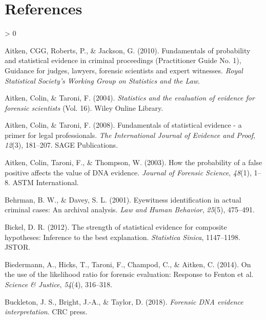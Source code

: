 \documentclass[
  10pt,
  dvipsnames,enabledeprecatedfontcommands]{scrartcl}
\newlength{\cslhangindent}
\newenvironment{CSLReferences}[2] %
 {%
  \setlength{\parindent}{0pt}
  \ifodd #1 \everypar{\setlength{\hangindent}{\cslhangindent}}\ignorespaces\fi
  \ifnum #2 > 0
  \setlength{\parskip}{#2\baselineskip}
  \fi
 }%
 {}
\begin{document}
\hypertarget{references}{%
\section*{References}\label{references}}

\hypertarget{refs}{}
\begin{CSLReferences}{1}{0}
\leavevmode\hypertarget{ref-aitken2010fundamentals}{}%
Aitken, CGG, Roberts, P., \& Jackson, G. (2010). Fundamentals of
probability and statistical evidence in criminal proceedings
({P}ractitioner {G}uide {N}o. 1), {G}uidance for judges, lawyers,
forensic scientists and expert witnesses. \emph{Royal Statistical
Society's Working Group on Statistics and the Law}.

\leavevmode\hypertarget{ref-aitken2004statistics}{}%
Aitken, Colin, \& Taroni, F. (2004). \emph{Statistics and the evaluation
of evidence for forensic scientists} (Vol. 16). Wiley Online Library.

\leavevmode\hypertarget{ref-aitken2008fundamentals}{}%
Aitken, Colin, \& Taroni, F. (2008). Fundamentals of statistical
evidence - a primer for legal professionals. \emph{The International
Journal of Evidence and Proof}, \emph{12}(3), 181--207. SAGE
Publications.

\leavevmode\hypertarget{ref-aitken2003probability}{}%
Aitken, Colin, Taroni, F., \& Thompson, W. (2003). How the probability
of a false positive affects the value of DNA evidence. \emph{Journal of
Forensic Science}, \emph{48}(1), 1--8. ASTM International.

\leavevmode\hypertarget{ref-behrman2001EyewitnessIdentificationActual}{}%
Behrman, B. W., \& Davey, S. L. (2001). Eyewitness identification in
actual criminal cases: {An} archival analysis. \emph{Law and Human
Behavior}, \emph{25}(5), 475--491.

\leavevmode\hypertarget{ref-bickel2012strength}{}%
Bickel, D. R. (2012). The strength of statistical evidence for composite
hypotheses: Inference to the best explanation. \emph{Statistica Sinica},
1147--1198. JSTOR.

\leavevmode\hypertarget{ref-biedermann2014UseLikelihoodRatio}{}%
Biedermann, A., Hicks, T., Taroni, F., Champod, C., \& Aitken, C.
(2014). On the use of the likelihood ratio for forensic evaluation:
{Response} to {Fenton} et al. \emph{Science \& Justice}, \emph{54}(4),
316--318.

\leavevmode\hypertarget{ref-buckleton2018forensic}{}%
Buckleton, J. S., Bright, J.-A., \& Taylor, D. (2018). \emph{Forensic
DNA evidence interpretation}. CRC press.


\end{CSLReferences}
\end{document}
